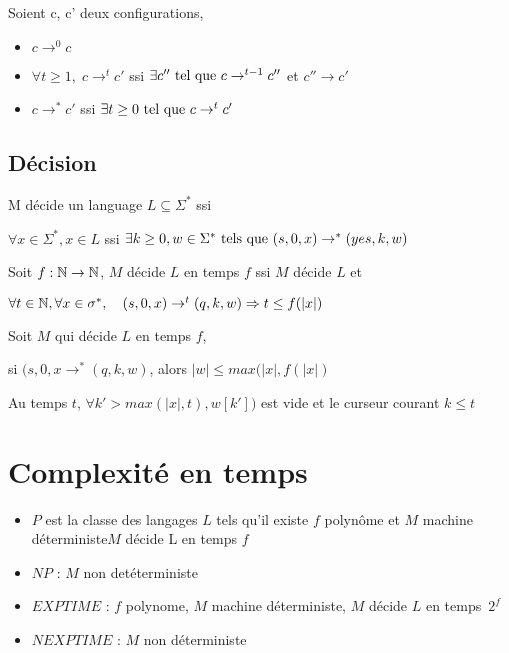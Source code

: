 \documentclass[10pt,a4paper]{article}
\begin{document}
\begin{definition} Soient c, c' deux configurations, \begin{itemize}
\item $c \rightarrow^0 c$
\item $ \forall t \geq 1, \; c \rightarrow^t c' $ ssi $ \exists c'' \tq c \rightarrow^{t-1}c''$ et $c'' \rightarrow c'$
\item $c \rightarrow^* c'$ ssi $\exists t \geq 0 \tq c \rightarrow^t c'$
\end{itemize} \end{definition}

\subsection{Décision} 

 \begin{definition}
M décide un language $L \subseteq \Sigma^*$ ssi 

$\forall x \in \Sigma^*, x \in L$ ssi $\exists k \geq 0, w \in \Sigma^* \tq[s] (s, 0, x) \rightarrow^* (yes, k, w)$\\
  \end{definition}

 \begin{definition}
 Soit $f : \Ns\to \Ns$, \quad $M$ décide $L$ en temps $f$ ssi $M$ décide $L$ et 

$\forall t \in \Ns, \forall x \in \sigma^*, \quad (s, 0, x) \rightarrow ^t (q, k, w) \Rightarrow t \leq f( | x | )$\\
 \end{definition}

\begin{prop}
 Soit $M$ qui décide $L$ en temps $f$, 

si $(s, 0, x \rightarrow^* (q, k, w)$, alors $ | w |  \leq max (  | x | , f( | x | )$
\end{prop}
 \begin{dem}
  Au temps $t$, $\forall k' > max (  | x | , t), w[k'] )$ est vide et le curseur courant $k \leq t$\\
 \end{dem}

 \section{Complexité en temps}
 
 \begin{definition}{}\begin{itemize}
 \item $P$ est la classe des langages $L$ tels qu'il existe $f$ polynôme et $M$ machine déterministe\tq[s] $M$ décide L en temps $f$
\item $NP$ : $M$ non detéterministe
\item $EXPTIME$ : $f$ polynome, $M$ machine déterministe, $M$ décide $L$ en temps~$2^f$
 \item $NEXPTIME$ : $M$ non déterministe
 \end{itemize}
 \end{definition}
\end{document}
